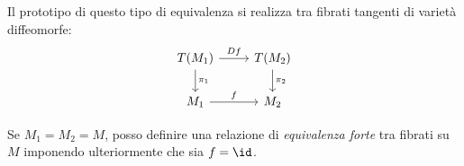 Il prototipo di questo tipo di equivalenza si realizza tra fibrati tangenti di varietà diffeomorfe: \[
\begin{tikzcd}
T(M_1) \arrow[r, "Df"] \arrow[d, "\pi_1"] & T(M_2) \arrow[d, "\pi_2"] \\
M_1 \arrow[r, "f"]  & M_2
\end{tikzcd} \]

Se  $M_1 = M_2 = M$, posso definire una relazione di \emph{equivalenza forte} tra fibrati su $M$ imponendo ulteriormente che sia $f = \id$.

